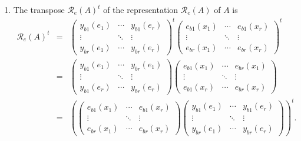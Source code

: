 \documentclass[aps,preprint]{revtex4}
\begin{document}
\begin{enumerate}
\item The transpose $\mathcal{R}_{e}\left( A\right) ^{t}$ of the
representation $\mathcal{R}_{e}\left( A\right) $ of $A$ is 
\begin{eqnarray}
\mathcal{R}_{e}\left( A\right) ^{t} &=&\left( 
\begin{array}{ccc}
y_{b1}\left( e_{1}\right) & \cdots & y_{b1}\left( e_{r}\right) \\ 
\vdots & \ddots & \vdots \\ 
y_{br}\left( e_{1}\right) & \cdots & y_{br}\left( e_{r}\right)%
\end{array}%
\right) ^{t}\left( 
\begin{array}{ccc}
e_{b1}\left( x_{1}\right) & \cdots & e_{b1}\left( x_{r}\right) \\ 
\vdots & \ddots & \vdots \\ 
e_{br}\left( x_{1}\right) & \cdots & e_{br}\left( x_{r}\right)%
\end{array}%
\right) ^{t} \\
&=&\left( 
\begin{array}{ccc}
y_{b1}\left( e_{1}\right) & \cdots & y_{br}\left( e_{1}\right) \\ 
\vdots & \ddots & \vdots \\ 
y_{b1}\left( e_{r}\right) & \cdots & y_{br}\left( e_{r}\right)%
\end{array}%
\right) \left( 
\begin{array}{ccc}
e_{b1}\left( x_{1}\right) & \cdots & e_{br}\left( x_{1}\right) \\ 
\vdots & \ddots & \vdots \\ 
e_{b1}\left( x_{r}\right) & \cdots & e_{br}\left( x_{r}\right)%
\end{array}%
\right) \\
&=&\left( \left( 
\begin{array}{ccc}
e_{b1}\left( x_{1}\right) & \cdots & e_{b1}\left( x_{r}\right) \\ 
\vdots & \ddots & \vdots \\ 
e_{br}\left( x_{1}\right) & \cdots & e_{br}\left( x_{r}\right)%
\end{array}%
\right) \left( 
\begin{array}{ccc}
y_{b1}\left( e_{1}\right) & \cdots & y_{b1}\left( e_{r}\right) \\ 
\vdots & \ddots & \vdots \\ 
y_{br}\left( e_{1}\right) & \cdots & y_{br}\left( e_{r}\right)%
\end{array}%
\right) \right) ^{t}.
\end{eqnarray}


\end{enumerate}
\end{document}
